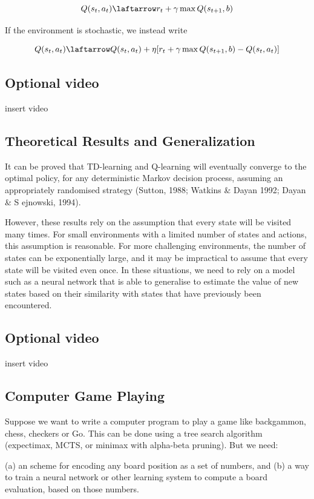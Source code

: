 \documentclass[11pt]{article}
\begin{document}
\[Q (s_t , a_t ) \laftarrow r_t + \gamma \max Q (s_{t+1}, b)\]

If the environment is stochastic, we instead write

\[Q (s_t , a_t ) \laftarrow Q(s_t, a_t) + \eta [r_t + \gamma \max Q(s_{t+1}, b) - Q(s_t, a_t)]\]

\subsection{Optional video}\label{subsec:optional-video6}
insert video

\subsection{Theoretical Results and Generalization}\label{subsec:theoretical-results-and-generalization}
It can be proved that TD-learning and Q-learning will eventually converge to
the optimal policy, for any deterministic Markov decision process, assuming an
appropriately randomised strategy (Sutton, 1988; Watkins \& Dayan 1992; Dayan \& S
ejnowski, 1994).

However, these results rely on the assumption that every state will be visited
many times.
For small environments with a limited number of states and actions, this
assumption is reasonable.
For more challenging environments, the number of states can be exponentially
large, and it may be impractical to assume that every state will be visited even
once.
In these situations, we need to rely on a model such as a neural network that
is able to generalise to estimate the value of new states based on their
similarity with states that have previously been encountered.

\subsection{Optional video}\label{subsec:optional-video7}
insert video

\subsection{Computer Game Playing}\label{subsec:computer-game-playing}
Suppose we want to write a computer program to play a game like backgammon,
chess, checkers or Go. This can be done using a tree search algorithm
(expectimax, MCTS, or minimax with alpha-beta pruning).
But we need:

(a) an scheme for encoding any board position as a set of numbers, and
(b) a way to train a neural network or other learning system to compute a board evaluation, based on those numbers.
\end{document}
